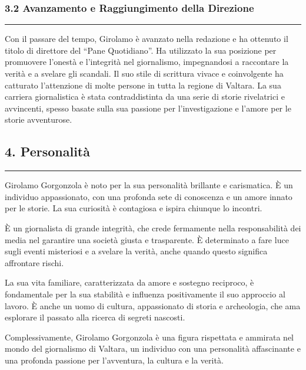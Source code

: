 \subsubsection{3.2 Avanzamento e Raggiungimento della
Direzione}\label{avanzamento-e-raggiungimento-della-direzione}

\begin{center}\rule{0.5\linewidth}{0.5pt}\end{center}

Con il passare del tempo, Girolamo è avanzato nella redazione e ha
ottenuto il titolo di direttore del ``Pane Quotidiano''. Ha utilizzato
la sua posizione per promuovere l'onestà e l'integrità nel giornalismo,
impegnandosi a raccontare la verità e a svelare gli scandali. Il suo
stile di scrittura vivace e coinvolgente ha catturato l'attenzione di
molte persone in tutta la regione di Valtara. La sua carriera
giornalistica è stata contraddistinta da una serie di storie rivelatrici
e avvincenti, spesso basate sulla sua passione per l'investigazione e
l'amore per le storie avventurose.

\subsection{4. Personalità}\label{personalituxe0}

\begin{center}\rule{0.5\linewidth}{0.5pt}\end{center}

Girolamo Gorgonzola è noto per la sua personalità brillante e
carismatica. È un individuo appassionato, con una profonda sete di
conoscenza e un amore innato per le storie. La sua curiosità è
contagiosa e ispira chiunque lo incontri.

È un giornalista di grande integrità, che crede fermamente nella
responsabilità dei media nel garantire una società giusta e trasparente.
È determinato a fare luce sugli eventi misteriosi e a svelare la verità,
anche quando questo significa affrontare rischi.

La sua vita familiare, caratterizzata da amore e sostegno reciproco, è
fondamentale per la sua stabilità e influenza positivamente il suo
approccio al lavoro. È anche un uomo di cultura, appassionato di storia
e archeologia, che ama esplorare il passato alla ricerca di segreti
nascosti.

Complessivamente, Girolamo Gorgonzola è una figura rispettata e ammirata
nel mondo del giornalismo di Valtara, un individuo con una personalità
affascinante e una profonda passione per l'avventura, la cultura e la
verità.

